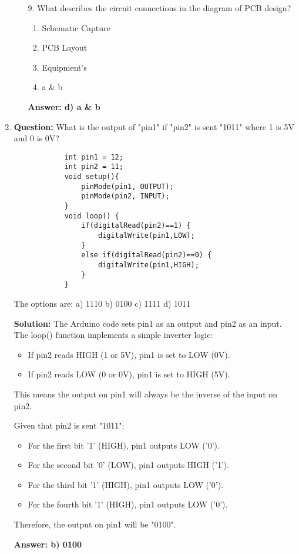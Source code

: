 \documentclass[a4paper,12pt]{article}
\begin{document}
\begin{enumerate}
		\begin{enumerate}
			\item[9.] What describes the circuit connections in the diagram of PCB design?
			\begin{enumerate}
				\item Schematic Capture
				\item PCB Layout
				\item Equipment's
				\item a \& b
			\end{enumerate}
			\textbf{Answer: d) a \& b}
		\end{enumerate}
		
			\item	\textbf{Question:} What is the output of "pin1" if "pin2" is sent "1011" where 1 is 5V and 0 is 0V?
		\begin{verbatim}
			int pin1 = 12;
			int pin2 = 11;
			void setup(){
				pinMode(pin1, OUTPUT);
				pinMode(pin2, INPUT);
			}
			void loop() {
				if(digitalRead(pin2)==1) {
					digitalWrite(pin1,LOW);
				}
				else if(digitalRead(pin2)==0) {
					digitalWrite(pin1,HIGH);
				}
			}
		\end{verbatim}
		The options are:
		a) 1110
		b) 0100
		c) 1111
		d) 1011
		
		\textbf{Solution:}
		The Arduino code sets pin1 as an output and pin2 as an input.
		The loop() function implements a simple inverter logic:
		\begin{itemize}
			\item If pin2 reads HIGH (1 or 5V), pin1 is set to LOW (0V).
			\item If pin2 reads LOW (0 or 0V), pin1 is set to HIGH (5V).
		\end{itemize}
		This means the output on pin1 will always be the inverse of the input on pin2.
		
		Given that pin2 is sent "1011":
		\begin{itemize}
			\item For the first bit '1' (HIGH), pin1 outputs LOW ('0').
			\item For the second bit '0' (LOW), pin1 outputs HIGH ('1').
			\item For the third bit '1' (HIGH), pin1 outputs LOW ('0').
			\item For the fourth bit '1' (HIGH), pin1 outputs LOW ('0').
		\end{itemize}
		Therefore, the output on pin1 will be "0100".
		
		\textbf{Answer: b) 0100}
		

\end{enumerate}
\end{document}
